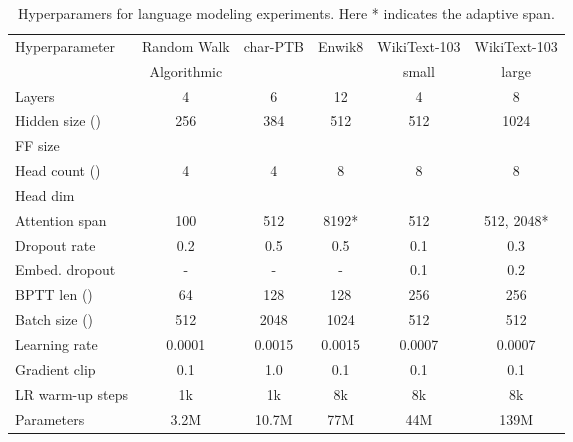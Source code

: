 \documentclass{article} \usepackage{iclr2021_conference}
\begin{document}
\begin{table*}[t]
    \centering
    \begin{tabular}{lccccc}
    \toprule
    Hyperparameter & Random Walk & char-PTB & Enwik8 & WikiText-103 & WikiText-103 \\
    & Algorithmic & & & small & large \\
    \midrule
    Layers              & 4     & 6     & 12    & 4     & 8 \\
    Hidden size ()   & 256   & 384   & 512   & 512   & 1024 \\
    FF size             &   &   &   &   &  \\
    Head count ()    & 4     & 4     & 8     & 8     & 8 \\
    Head dim            &  &  & & &  \\
    Attention span      & 100   & 512   & 8192*   & 512 & 512, 2048* \\
    Dropout rate        & 0.2   & 0.5   & 0.5   & 0.1   & 0.3 \\
    Embed. dropout      & -     & -     & -     & 0.1   & 0.2 \\
    BPTT len ()      & 64    & 128   & 128   & 256   & 256 \\
    Batch size ()    & 512   & 2048  & 1024  & 512   & 512 \\ 
    Learning rate       & 0.0001& 0.0015& 0.0015& 0.0007& 0.0007 \\
    Gradient clip       & 0.1   & 1.0   & 0.1   & 0.1   & 0.1 \\
    LR warm-up steps    & 1k    & 1k    & 8k    & 8k    & 8k \\
    \midrule
    Parameters          & 3.2M  & 10.7M & 77M   & 44M   & 139M \\
    \bottomrule
    \end{tabular}
    \caption{Hyperparamers for language modeling experiments. Here * indicates the adaptive span.}
    \label{tab:hyper_lm}
\end{table*}
\end{document}
